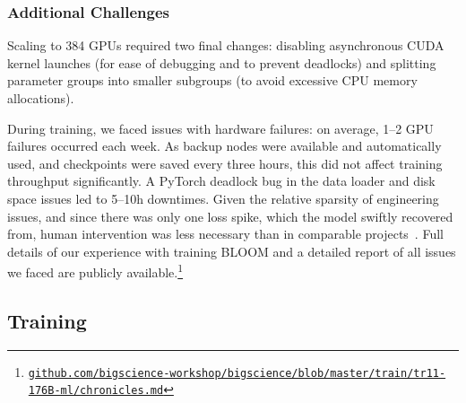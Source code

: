 \documentclass[twoside,11pt]{article}
\begin{document}
\subsubsection{Additional Challenges}

Scaling to 384 GPUs required two final changes: disabling asynchronous CUDA kernel launches (for ease of debugging and to prevent deadlocks) and splitting parameter groups into smaller subgroups (to avoid excessive CPU memory allocations). 

During training, we faced issues with hardware failures: on average, 1--2 GPU failures occurred each week. As backup nodes were available and automatically used, and checkpoints were saved every three hours, this did not affect training throughput significantly. A PyTorch deadlock bug in the data loader and disk space issues led to 5--10h downtimes. Given the relative sparsity of engineering issues, and since there was only one loss spike, which the model swiftly recovered from, human intervention was less necessary than in comparable projects~\citep{zhang2022opt}.
Full details of our experience with training BLOOM and a detailed report of all issues we faced are publicly available.\footnote{\href{https://github.com/bigscience-workshop/bigscience/blob/master/train/tr11-176B-ml/chronicles.md}{\texttt{github.com/bigscience-workshop/bigscience/blob/master/train/tr11-176B-ml/chronicles.md}}}


\subsection{Training}
\label{sec:training}
\end{document}
